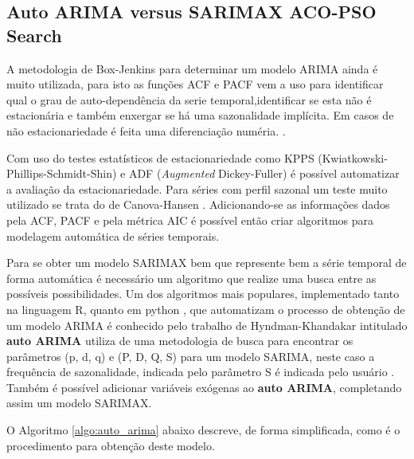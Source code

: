 \subsection{Auto ARIMA versus SARIMAX ACO-PSO Search}
\label{subsec:autoarima_psoaco}

A metodologia de Box-Jenkins \cite{hipel1977advances} para determinar um modelo ARIMA ainda é muito utilizada, para isto as funções ACF e PACF vem a uso para identificar qual o grau de auto-dependência da serie temporal,identificar se esta não é estacionária e também enxergar se há uma sazonalidade implícita. Em casos de não estacionariedade é feita uma diferenciação numéria. \cite{hipel1977advances,atique2019forecasting, hyndman2020forecasting}.

Com uso do testes estatísticos de estacionariedade como KPPS (Kwiatkowski\hyp{}Phillips\hyp{}Schmidt\hyp{}Shin) \cite{kwiatkowski1992testing} e ADF (\textit{Augmented} Dickey\hyp{}Fuller) \cite{dickey1979distribution} é possível automatizar a avaliação da estacionariedade. Para séries com perfil sazonal um teste muito utilizado se trata do de Canova-Hansen \cite{canova1995seasonal}. Adicionando-se as informações dados pela ACF, PACF e pela métrica AIC é possível então criar algoritmos para modelagem automática de séries temporais.

Para se obter um modelo SARIMAX bem que represente bem a série temporal de forma automática é necessário um algoritmo que realize uma busca entre as possíveis possibilidades. Um dos algoritmos mais populares, implementado tanto na linguagem R, quanto em python \cite{smith2017pmdarima}, que automatizam o processo de obtenção de um modelo ARIMA é conhecido pelo trabalho de Hyndman-Khandakar intitulado \textbf{auto ARIMA} \cite{hyndman2007automatic, hyndman2020forecasting} utiliza de uma metodologia de busca para encontrar os parâmetros (p, d, q) e (P, D, Q, S) para um modelo SARIMA, neste caso a frequência de sazonalidade, indicada pelo parâmetro S é indicada pelo usuário \cite{hyndman2007automatic, smith2017pmdarima}. Também é possível adicionar variáveis exógenas ao \textbf{auto ARIMA}, completando assim um modelo SARIMAX.

O Algoritmo \ref{algo:auto_arima} abaixo descreve, de forma simplificada, como é o procedimento para obtenção deste modelo.

